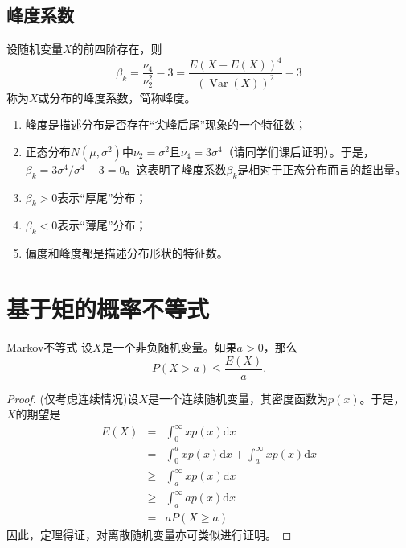 \subsection{峰度系数}
\begin{definition}\label{def:kurtosis}
设随机变量$X$的前四阶存在，则
$$\beta_{k}=\frac{\nu_{4}}{\nu_{2}^{2}}-3=\frac{E(X-E(X))^{4}}{(\operatorname{Var}(X))^{2}}-3 $$
称为$X$或分布的峰度系数，简称峰度。
\end{definition}
\begin{remark}
    \begin{enumerate}
        \item 峰度是描述分布是否存在“尖峰后尾”现象的一个特征数；
        \item 正态分布$N(\mu,\sigma^2)$中$\nu_2 = \sigma^2$且$\nu_4 = 3\sigma^4$（请同学们课后证明）。于是，$\beta_k = 3\sigma^4 / \sigma^4 - 3 =0$。这表明了峰度系数$\beta_k$是相对于正态分布而言的超出量。
        \item $\beta_{k}>0$表示“厚尾”分布；
         \item $\beta_{k}<0$表示“薄尾”分布；
         \item 偏度和峰度都是描述分布形状的特征数。
    \end{enumerate}
\end{remark}


\section{基于矩的概率不等式}
\begin{theorem}{Markov不等式}\label{thm:chap06_Markov_Inequality}
    设$X$是一个非负随机变量。如果$a>0$，那么
	$$P(X>a ) \leq \frac{E(X)}{a}.$$
\end{theorem}
\begin{proof}
     (仅考虑连续情况)设$X$是一个连续随机变量，其密度函数为$p(x)$。于是，$X$的期望是
     \begin{eqnarray*}
        E(X) &=& \int_{0}^{\infty} xp(x)\text{d} x \\
        &=& \int_{0}^{a} xp(x)\text{d} x +\int_{a}^{\infty} xp(x)\text{d} x \\
        &\geq&  \int_{a}^{\infty} xp(x)\text{d} x 
        \\
        &\geq&  \int_{a}^{\infty} ap(x)\text{d} x \\
        &=& a P(X\geq a)
     \end{eqnarray*}
因此，定理得证，对离散随机变量亦可类似进行证明。
\end{proof}

